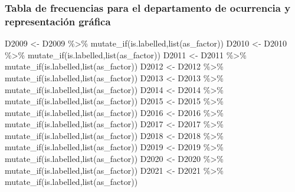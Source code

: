 \documentclass[
]{article}
\newenvironment{Shaded}{\begin{snugshade}}{\end{snugshade}}
\newcommand{\FunctionTok}[1]{\textcolor[rgb]{0.00,0.00,0.00}{#1}}
\newcommand{\NormalTok}[1]{#1}
\newcommand{\OtherTok}[1]{\textcolor[rgb]{0.56,0.35,0.01}{#1}}
\newcommand{\SpecialCharTok}[1]{\textcolor[rgb]{0.00,0.00,0.00}{#1}}
\begin{document}
\hypertarget{tabla-de-frecuencias-para-el-departamento-de-ocurrencia-y-representaciuxf3n-gruxe1fica}{%
\subsubsection{Tabla de frecuencias para el departamento de ocurrencia y
representación
gráfica}\label{tabla-de-frecuencias-para-el-departamento-de-ocurrencia-y-representaciuxf3n-gruxe1fica}}

\begin{Shaded}
\begin{Highlighting}[]
\NormalTok{D2009 }\OtherTok{\textless{}{-}}\NormalTok{ D2009 }\SpecialCharTok{\%\textgreater{}\%}
  \FunctionTok{mutate\_if}\NormalTok{(is.labelled,}\FunctionTok{list}\NormalTok{(as\_factor))}
\NormalTok{D2010 }\OtherTok{\textless{}{-}}\NormalTok{ D2010 }\SpecialCharTok{\%\textgreater{}\%}
  \FunctionTok{mutate\_if}\NormalTok{(is.labelled,}\FunctionTok{list}\NormalTok{(as\_factor))}
\NormalTok{D2011 }\OtherTok{\textless{}{-}}\NormalTok{ D2011 }\SpecialCharTok{\%\textgreater{}\%}
  \FunctionTok{mutate\_if}\NormalTok{(is.labelled,}\FunctionTok{list}\NormalTok{(as\_factor))}
\NormalTok{D2012 }\OtherTok{\textless{}{-}}\NormalTok{ D2012 }\SpecialCharTok{\%\textgreater{}\%}
  \FunctionTok{mutate\_if}\NormalTok{(is.labelled,}\FunctionTok{list}\NormalTok{(as\_factor))}
\NormalTok{D2013 }\OtherTok{\textless{}{-}}\NormalTok{ D2013 }\SpecialCharTok{\%\textgreater{}\%}
  \FunctionTok{mutate\_if}\NormalTok{(is.labelled,}\FunctionTok{list}\NormalTok{(as\_factor))}
\NormalTok{D2014 }\OtherTok{\textless{}{-}}\NormalTok{ D2014 }\SpecialCharTok{\%\textgreater{}\%}
  \FunctionTok{mutate\_if}\NormalTok{(is.labelled,}\FunctionTok{list}\NormalTok{(as\_factor))}
\NormalTok{D2015 }\OtherTok{\textless{}{-}}\NormalTok{ D2015 }\SpecialCharTok{\%\textgreater{}\%}
  \FunctionTok{mutate\_if}\NormalTok{(is.labelled,}\FunctionTok{list}\NormalTok{(as\_factor))}
\NormalTok{D2016 }\OtherTok{\textless{}{-}}\NormalTok{ D2016 }\SpecialCharTok{\%\textgreater{}\%}
  \FunctionTok{mutate\_if}\NormalTok{(is.labelled,}\FunctionTok{list}\NormalTok{(as\_factor))}
\NormalTok{D2017 }\OtherTok{\textless{}{-}}\NormalTok{ D2017 }\SpecialCharTok{\%\textgreater{}\%}
  \FunctionTok{mutate\_if}\NormalTok{(is.labelled,}\FunctionTok{list}\NormalTok{(as\_factor))}
\NormalTok{D2018 }\OtherTok{\textless{}{-}}\NormalTok{ D2018 }\SpecialCharTok{\%\textgreater{}\%}
  \FunctionTok{mutate\_if}\NormalTok{(is.labelled,}\FunctionTok{list}\NormalTok{(as\_factor))}
\NormalTok{D2019 }\OtherTok{\textless{}{-}}\NormalTok{ D2019 }\SpecialCharTok{\%\textgreater{}\%}
  \FunctionTok{mutate\_if}\NormalTok{(is.labelled,}\FunctionTok{list}\NormalTok{(as\_factor))}
\NormalTok{D2020 }\OtherTok{\textless{}{-}}\NormalTok{ D2020 }\SpecialCharTok{\%\textgreater{}\%}
  \FunctionTok{mutate\_if}\NormalTok{(is.labelled,}\FunctionTok{list}\NormalTok{(as\_factor))}
\NormalTok{D2021 }\OtherTok{\textless{}{-}}\NormalTok{ D2021 }\SpecialCharTok{\%\textgreater{}\%}
  \FunctionTok{mutate\_if}\NormalTok{(is.labelled,}\FunctionTok{list}\NormalTok{(as\_factor))}


\end{Highlighting}
\end{Shaded}
\end{document}
